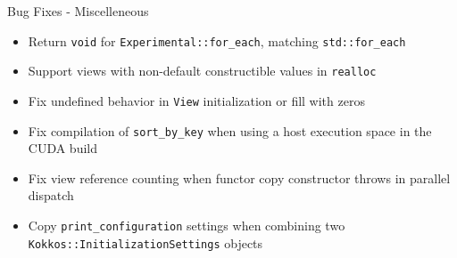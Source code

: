 \begin{frame}[fragile]{Bug Fixes - Miscelleneous}
\begin{itemize}
\item Return \texttt{void} for \texttt{Experimental::for\_each}, matching \texttt{std::for\_each}
\item Support views with non-default constructible values in \texttt{realloc}
\item Fix undefined behavior in \texttt{View} initialization or fill with zeros
\item Fix compilation of \texttt{sort\_by\_key} when using a host execution space in the CUDA build
\item Fix view reference counting when functor copy constructor throws in parallel dispatch
\item Copy \texttt{print\_configuration} settings when combining two \texttt{Kokkos::InitializationSettings} objects
\end{itemize}

\end{frame}


